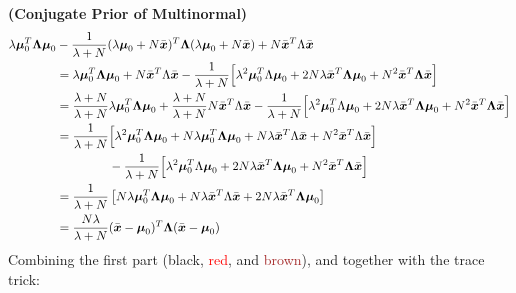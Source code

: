 \begin{remark}{\textbf{(Conjugate Prior of Multinormal)}}
\begin{equation*}
\begin{aligned}
        \lambda\boldsymbol \mu_0^T\boldsymbol \Lambda\boldsymbol \mu_0 &- \frac{1}{\lambda + N}(\lambda\boldsymbol \mu_0 + N\bar{\boldsymbol x})^T\boldsymbol \Lambda (\lambda\boldsymbol \mu_0 + N\bar{\boldsymbol x}) + N\bar{\boldsymbol x}^T\Lambda\bar{\boldsymbol x} \\
        &= \lambda\boldsymbol \mu_0^T\boldsymbol \Lambda\boldsymbol \mu_0+ N\bar{\boldsymbol x}^T\Lambda\bar{\boldsymbol x} - \frac{1}{\lambda + N}\Big[ \lambda^2\boldsymbol \mu_0^T\Lambda\boldsymbol \mu_0 + 2N\lambda\bar{\boldsymbol x}^T\boldsymbol\Lambda\boldsymbol\mu_0 + N^2\bar{\boldsymbol x}^T\boldsymbol \Lambda\bar{\boldsymbol x} \Big]\\
        &= \frac{\lambda + N}{\lambda + N}\lambda\boldsymbol \mu_0^T\boldsymbol \Lambda\boldsymbol \mu_0+ \frac{\lambda + N}{\lambda + N}N\bar{\boldsymbol x}^T\Lambda\bar{\boldsymbol x} - \frac{1}{\lambda + N}\Big[ \lambda^2\boldsymbol \mu_0^T\Lambda\boldsymbol \mu_0 + 2N\lambda\bar{\boldsymbol x}^T\boldsymbol\Lambda\boldsymbol\mu_0 + N^2\bar{\boldsymbol x}^T\boldsymbol \Lambda\bar{\boldsymbol x} \Big]\\
        &= \begin{aligned}[t]
            \frac{1}{\lambda + N}&\Big[ \lambda^2\boldsymbol \mu_0^T\boldsymbol \Lambda\boldsymbol \mu_0 + N\lambda\boldsymbol \mu_0^T\boldsymbol \Lambda\boldsymbol \mu_0 + N\lambda\bar{\boldsymbol x}^T\Lambda\bar{\boldsymbol x} +N^2\bar{\boldsymbol x}^T\Lambda\bar{\boldsymbol x} \Big] \\
            &- \frac{1}{\lambda + N}\Big[ \lambda^2\boldsymbol \mu_0^T\Lambda\boldsymbol \mu_0 + 2N\lambda\bar{\boldsymbol x}^T\boldsymbol\Lambda\boldsymbol\mu_0 + N^2\bar{\boldsymbol x}^T\boldsymbol \Lambda\bar{\boldsymbol x} \Big]\\
        \end{aligned} \\
        &= \frac{1}{\lambda + N}\left[ N\lambda\boldsymbol \mu_0^T\boldsymbol \Lambda\boldsymbol \mu_0 + N\lambda\bar{\boldsymbol x}^T\Lambda\bar{\boldsymbol x} + 2N\lambda\bar{\boldsymbol x}^T\boldsymbol\Lambda\boldsymbol\mu_0 \right] \\
        &= \frac{N\lambda}{\lambda + N}(\bar{\boldsymbol x} - \boldsymbol \mu_0)^T\boldsymbol \Lambda(\bar{\boldsymbol x} - \boldsymbol \mu_0) \\
    \end{aligned}
    \end{equation*}
    Combining the first part (black, \textcolor{red}{red}, and \textcolor{brown}{brown}), and together with the trace trick:

\end{remark}
